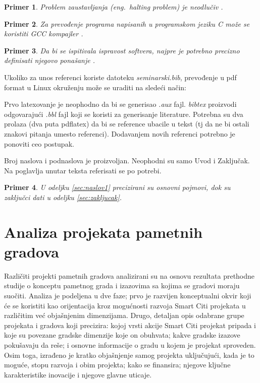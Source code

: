 \documentclass[a4paper,12pt]{article}
\newtheorem{primer}{Primer}[section]
\begin{document}
{\begin{primer}
Problem zaustavljanja (eng.~{\em halting problem}) je neodlučiv \cite{haltingproblem}.
\end{primer}

\begin{primer}
Za prevođenje programa napisanih u programskom jeziku C može se koristiti GCC kompajler \cite{gcc}.
\end{primer}

\begin{primer}
 Da bi se ispitivala ispravost softvera, najpre je potrebno precizno definisati njegovo ponašanje \cite{laski2009software}. 
\end{primer}

Ukoliko za unos referenci koriste datoteku {\em seminarski.bib},  prevođenje u pdf format u Linux okruženju može se uraditi na sledeći način:

Prvo latexovanje je neophodno da bi se generisao {\em .aux} fajl. {\em bibtex} proizvodi odgovarajući {\em .bbl} fajl koji se koristi za generisanje literature. 
Potrebna su dva prolaza (dva puta pdflatex) da bi se reference ubacile u tekst (tj da ne bi ostali znakovi pitanja umesto referenci). Dodavanjem novih referenci potrebno je ponoviti ceo postupak.  


Broj naslova i podnaslova je proizvoljan. Neophodni su samo Uvod i Zaključak. Na poglavlja unutar teksta referisati se po potrebi. 
\begin{primer}
U odeljku \ref{sec:naslov1} precizirani su osnovni pojmovi, dok su zaključci dati u odeljku \ref{sec:zakljucak}.
\end{primer}




\section{Analiza projekata pametnih gradova}
\label{slike_i_tabele}

Različiti projekti pametnih gradova analizirani su na osnovu rezultata prethodne studije o konceptu pametnog grada i izazovima sa kojima se gradovi moraju suočiti. Analiza je podeljena u dve faze; prvo je razvijen konceptualni okvir koji će se koristiti kao orijentacija kroz mogućnosti razvoja Smart Citi projekata u različitim već objašnjenim dimenzijama. Drugo, detaljan opis odabrane grupe projekata i gradova koji precizira: kojoj vrsti akcije Smart Citi projekat pripada i koje su povezane gradske dimenzije koje on obuhvata; kakve gradske izazove pokušavaju da reše; i osnovne informacije o gradu u kojem je projekat sproveden. Osim toga, izrađeno je kratko objašnjenje samog projekta uključujući, kada je to moguće, stopu razvoja i obim projekta; kako se finansira; njegove ključne karakteristike inovacije i njegove glavne uticaje. \\

}
\end{document}
